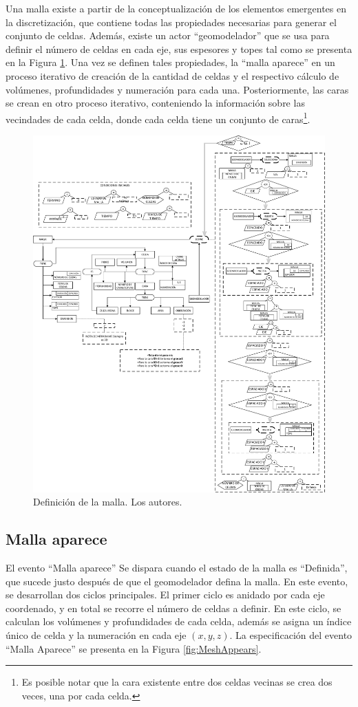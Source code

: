 Una malla existe a partir de la conceptualización de los elementos emergentes en la discretización, que contiene todas las propiedades necesarias para generar el conjunto de celdas. Además, existe un actor ``geomodelador'' que se usa para definir el número de celdas en cada eje, sus espesores y topes tal como se presenta en  la Figura \ref{fig:Mesh}. Una vez se definen tales propiedades, la ``malla aparece'' en un proceso iterativo de creación de la cantidad de celdas y el respectivo cálculo de volúmenes, profundidades y numeración para cada una. Posteriormente, las caras se crean en otro proceso iterativo, conteniendo la información sobre las vecindades de cada celda, donde cada celda tiene un conjunto de caras\footnote{Es posible notar que la cara existente entre dos celdas vecinas se crea dos veces, una por cada celda.}.\\

\begin{figure}[h]
	\centering%
	\includegraphics[width=0.8\linewidth]{Fig/Mesh.pdf}%
	\caption[Definición de la malla.]{Definición de la malla. Los autores.} \label{fig:Mesh}
\end{figure}


\subsection{Malla aparece}\label{subsec:PS_MeshAppears}
El evento ``Malla aparece'' Se dispara cuando el estado de la malla es ``Definida'', que sucede justo después de que el geomodelador defina la malla. En este evento, se desarrollan dos ciclos principales. El primer ciclo es anidado por cada eje coordenado, y en total se recorre el número de celdas a definir. En este ciclo, se calculan los volúmenes y profundidades de cada celda, además se asigna un índice único de celda y la numeración en cada eje $(x,y,z)$. La especificación del evento ``Malla Aparece'' se presenta en la Figura \ref{fig:MeshAppears}.\\

